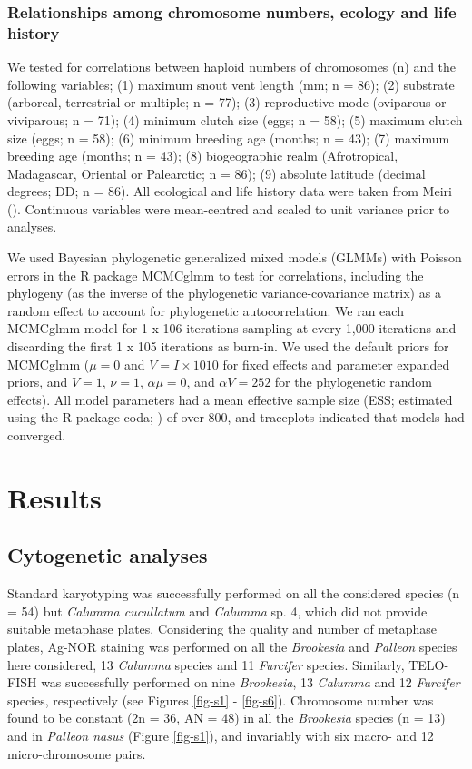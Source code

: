 \documentclass[a4paper, 12pt]{article}
\begin{document}
\subsubsection{Relationships among chromosome numbers, ecology and life history}
We tested for correlations between haploid numbers of chromosomes (n) and the following variables; (1) maximum snout vent length (mm; n = 86); (2) substrate (arboreal, terrestrial or multiple; n = 77); (3) reproductive mode (oviparous or viviparous; n = 71); (4) minimum clutch size (eggs; n = 58); (5) maximum clutch size (eggs; n = 58); (6) minimum breeding age (months; n = 43); (7) maximum breeding age (months; n = 43); (8) biogeographic realm (Afrotropical, Madagascar, Oriental or Palearctic; n = 86); (9) absolute latitude (decimal degrees; DD; n = 86). 
All ecological and life history data were taken from Meiri (\citeyear{meiri2018traits}). 
Continuous variables were mean-centred and scaled to unit variance prior to analyses.

We used Bayesian phylogenetic generalized mixed models (GLMMs) with Poisson errors in the R package MCMCglmm \citep{hadfield2010mcmc} to test for correlations, including the phylogeny (as the inverse of the phylogenetic variance-covariance matrix) as a random effect to account for phylogenetic autocorrelation. 
We ran each MCMCglmm model for 1 x 106 iterations sampling at every 1,000 iterations and discarding the first 1 x 105 iterations as burn-in. 
We used the default priors for MCMCglmm ($μ = 0$ and $V = I × 1010$ for fixed effects and parameter expanded priors, and $V = 1$, $\nu = 1$, $\alpha \mu = 0$, and $\alpha V = 252$ for the phylogenetic random effects). 
All model parameters had a mean effective sample size (ESS; estimated using the R package coda; \citealt{plummer2006coda}) of over 800, and traceplots indicated that models had converged.

\section{Results}

\subsection{Cytogenetic analyses}

Standard karyotyping was successfully performed on all the considered species (n = 54) but \textit{Calumma cucullatum} and \textit{Calumma} sp. 4, which did not provide suitable metaphase plates.
Considering the quality and number of metaphase plates, Ag-NOR staining was performed on all the \textit{Brookesia} and \textit{Palleon} species here considered, 13 \textit{Calumma} species and 11 \textit{Furcifer} species. 
Similarly, TELO-FISH was successfully performed on nine \textit{Brookesia}, 13 \textit{Calumma} and 12 \textit{Furcifer} species, respectively (see Figures \ref{fig-s1} - \ref{fig-s6}).
Chromosome number was found to be constant (2n = 36, AN = 48) in all the \textit{Brookesia} species (n = 13) and in \textit{Palleon nasus} (Figure \ref{fig-s1}), and invariably with six macro- and 12 micro-chromosome pairs.
\end{document}
